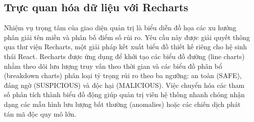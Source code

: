 \subsection{Trực quan hóa dữ liệu với Recharts}
Nhiệm vụ trọng tâm của giao diện quản trị là biểu diễn đồ họa các xu hướng phân giải tên miền và phân bố điểm số rủi ro. Yêu cầu này được giải quyết thông qua thư viện Recharts, một giải pháp kết xuất biểu đồ thiết kế riêng cho hệ sinh thái React. Recharts được ứng dụng để khởi tạo các biểu đồ đường (line charts) nhằm theo dõi lưu lượng truy vấn theo thời gian và các biểu đồ phân bổ (breakdown charts) phân loại tỷ trọng rủi ro theo ba ngưỡng: an toàn (SAFE), đáng ngờ (SUSPICIOUS) và độc hại (MALICIOUS). Việc chuyển hóa các tham số phân tích thành biểu đồ động giúp quản trị viên hệ thống nhanh chóng nhận dạng các mẫu hình lưu lượng bất thường (anomalies) hoặc các chiến dịch phát tán mã độc quy mô lớn.
